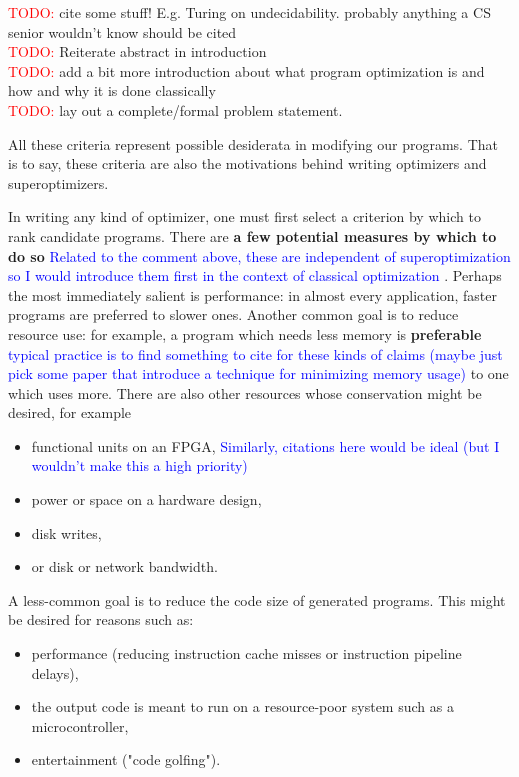 \documentclass[12pt,twoside]{reedthesis}
\newcommand{\red}[1]{\textcolor{red}{#1}}
\newcommand{\comment}[2]{\textbf{#1} \textcolor{blue}{#2}}
\begin{document}
    \red{TODO:} cite some stuff! E.g. Turing on undecidability. probably anything a CS senior wouldn't know should be cited
    \\ \red{TODO:} Reiterate abstract in introduction
    \\ \red{TODO:} add a bit more introduction about what program optimization is and how and why it is done classically
    \\ \red{TODO:} lay out a complete/formal problem statement. 
    
    All these criteria represent possible desiderata in modifying our programs.
    That is to say, these criteria are also the motivations behind writing optimizers and superoptimizers. 
    
    In writing any kind of optimizer, one must first select a criterion by which to rank candidate programs.
    There are
        \comment{a few potential measures by which to do so}{Related to the comment above, these are independent of superoptimization so I would introduce them first in the context of classical optimization}
        .
    Perhaps the most immediately salient is performance: 
        in almost every application, faster programs are preferred to slower ones.
    Another common goal is to reduce resource use: 
        for example, a program which needs less memory is
            \comment{preferable}{typical practice is to find something to cite for these kinds of claims (maybe just pick some paper that introduce a technique for minimizing memory usage)}
            to one which uses more.
    There are also other resources whose conservation might be desired, for example 
    \begin{itemize}
        \item functional units on an FPGA, \comment{}{Similarly, citations here would be ideal (but I wouldn't make this a high priority)}
        \item power or space on a hardware design, 
        \item disk writes, 
        \item or disk or network bandwidth.
    \end{itemize}
    A less-common goal is to reduce the code size of generated programs.
    This might be desired for reasons such as:
    \begin{itemize}
            \item performance (reducing instruction cache misses or instruction pipeline delays), 
            \item the output code is meant to run on a resource-poor system such as a microcontroller, 
            \item entertainment ("code golfing").
    \end{itemize}
    
\end{document}
